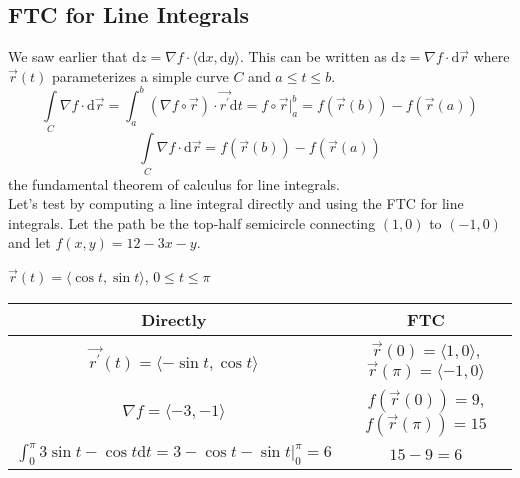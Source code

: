 \subsection{FTC for Line Integrals}
\noindent
We saw earlier that $\mathrm{d}z = \nabla f \cdot \langle \mathrm{d}x, \mathrm{d}y \rangle$. This can be written as $\mathrm{d}z = \nabla f \cdot \mathrm{d}\vec{r}$ where $\vec{r}(t)$ parameterizes a simple curve $C$ and $a \leq t \leq b$.
\begin{equation*}
	\int\limits_{C}{\nabla f \cdot \mathrm{d}\vec{r}} = \int_{a}^{b}{(\nabla f\circ\vec{r}) \cdot \vec{r^\prime}\mathrm{d}t} = f\circ\vec{r}\rvert_{a}^{b} = f(\vec{r}(b))-f(\vec{r}(a))
\end{equation*}
\begin{equation*}
	\int\limits_{C}{\nabla f\cdot\mathrm{d}\vec{r}}=f(\vec{r}(b))-f(\vec{r}(a))
\end{equation*}
the fundamental theorem of calculus for line integrals.\\

\noindent
Let's test by computing a line integral directly and using the FTC for line integrals. Let the path be the top-half semicircle connecting $(1,0)$ to $(-1,0)$ and let $f(x,y) = 12 - 3x - y$.
\begin{center}
	$\vec{r}(t)=\langle\cos{t},\sin{t}\rangle$, $0\leq t\leq\pi$
	\begin{tabular}{c|c}
		Directly & FTC \\ \hline
		$\vec{r^\prime}(t) = \langle-\sin{t}, \cos{t}\rangle$ & $\vec{r}(0) = \langle 1, 0 \rangle$, $\vec{r}(\pi) = \langle -1, 0 \rangle$ \\
		$\nabla f = \langle -3, -1 \rangle$ & $f(\vec{r}(0)) = 9$, $f(\vec{r}(\pi)) = 15$ \\
		$\int_{0}^{\pi}{3\sin{t} - \cos{t}\mathrm{d}t} = 3 - \cos{t} - \sin{t}\rvert_{0}^{\pi} = 6$ & $15 - 9 = 6$ \\
	\end{tabular}
\end{center}

